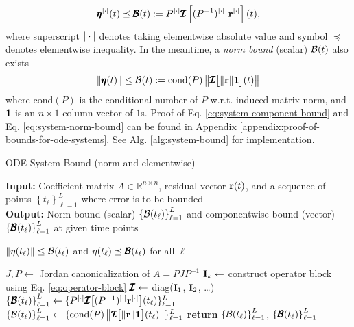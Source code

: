     \begin{equation}\label{eq:system-component-bound}
        \pmb{\eta}^{|\cdot|}(t) \preceq \pmb{\mathcal{B}}(t) := P^{|\cdot|} \pmb{\mathcal{I}}\left[(P^{-1})^{|\cdot|} \ \mathbf{r}^{|\cdot|}\right](t),
    \end{equation}
    where superscript $|\cdot|$ denotes taking elementwise absolute value and symbol $\preceq$ denotes elementwise inequality. In the meantime, a \textit{norm bound} (scalar) $\mathcal{B}(t)$ also exists
    \begin{equation}\label{eq:system-norm-bound}
        \left\|\pmb{\eta}(t)\right\| \leq \mathcal{B}(t) := \mathrm{cond}(P)\left\|\pmb{\mathcal{I}}\big[\|\mathbf{r}\|\mathbf{1}\big](t)\right\|
    \end{equation}
    where $\mathrm{cond}(P)$ is the conditional number of $P$ w.r.t. induced matrix norm, and $\mathbf{1}$ is an $n\times 1$ column vector of $1$s. 
    Proof of Eq. \eqref{eq:system-component-bound} and Eq. \eqref{eq:system-norm-bound} can be found in Appendix \ref{appendix:proof-of-bounds-for-ode-systems}.
    See Alg. \ref{alg:system-bound} for implementation.

    \makeatletter
    \setlength{\@fptop}{0pt}
    \begin{algorithm}
        \caption{ODE System Bound (norm and elementwise)}\label{alg:system-bound}
        \textbf{Input:} Coefficient matrix $A \in \mathbb{R}^{n\times n}$, residual vector $\mathbf{r}(t)$, and a sequence of points $\left\{t_\ell\right\}_{\ell=1}^{L}$ where error is to be bounded\\
        \textbf{Output:} Norm bound (scalar) $\left\{\mathcal{B}(t_\ell)\right\}_{\ell=1}^{L}$ and componentwise bound (vector) $\left\{\pmb{\mathcal{B}}(t_\ell)\right\}_{\ell=1}^{L}$ at given time points
        \begin{algorithmic}
            \Ensure $\|\eta(t_\ell)\| \leq \mathcal{B}(t_\ell)$ and $\eta(t_\ell) \preceq \pmb{\mathcal{B}}(t_\ell)$ for all $\ell$

            \State $J, P \gets $ Jordan canonicalization of $A = PJP^{-1}$
                \State $\mathbf{I}_k \gets$ construct operator block using Eq. \eqref{eq:operator-block} 
            \EndFor
            \State $\pmb{\mathcal{I}} \gets$ diag($\mathbf{I}_1$, $\mathbf{I}_2$,  \dots)
            \State $\left\{\pmb{\mathcal{B}}(t_\ell)\right\}_{\ell=1}^{L} \gets \{P^{|\cdot|} \pmb{\mathcal{I}}\big[(P^{-1})^{|\cdot|} \mathbf{r}^{|\cdot|}\big](t_\ell)\}_{\ell=1}^{L}$
            \State $\left\{\mathcal{B}(t_\ell)\right\}_{\ell=1}^{L} \gets \{\mathrm{cond}(P)\left\|\pmb{\mathcal{I}}\big[\|\mathbf{r}\|\mathbf{1}\big](t_\ell)\right\|\}_{\ell=1}^{L}$
            \State \textbf{return} $\left\{\mathcal{B}(t_\ell)\right\}_{\ell=1}^{L}$, $\left\{\pmb{\mathcal{B}}(t_\ell)\right\}_{\ell=1}^{L}$
        \end{algorithmic}
    \end{algorithm}
    \makeatother